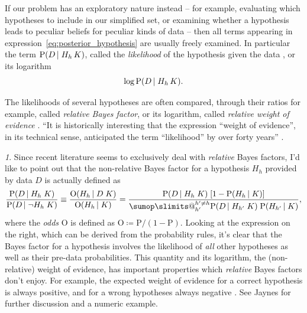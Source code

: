 \documentclass[\ifafour a4paper,12pt,\else a5paper,10pt,\fi%
onecolumn,oneside,article,%
british%
]{memoir}
\makeatletter
\theoremstyle{remark}
\theoremstyle{innote}
\newtheorem*{innote}{}
\def\sum{\DOTSI\sumop\slimits@}
\newcommand*{\citep}{\parencites}
\newcommand*{\citey}{\parencites*}
\newcommand*{\defd}{\coloneqq}
\newcommand*{\p}{\mathrm{P}}%
\renewcommand*{\|}[1][]{\nonscript\,#1\vert\nonscript\;\mathopen{}}
\newcommand*{\sect}{\S}%
\newcommand*{\sects}{\S\S}%
\newcommand*{\chap}{ch.}%
\newcommand*{\chaps}{chs}%
\newcommand*{\yK}{K}
\newcommand*{\yO}{\mathrm{O}}
\makeatother
\begin{document}
If our problem has an exploratory nature instead -- for example, evaluating
which hypotheses to include in our simplified set, or examining whether a
hypothesis leads to peculiar beliefs for peculiar kinds of data -- then all
terms appearing in expression~\eqref{eq:posterior_hypothesis} are usually
freely examined. In particular the term $\p(D \| H_{h} \, \yK)$, called the
\emph{likelihood} of the hypothesis given the data \citep[\sect~6.1
p.~62]{good1950}, or its logarithm
\begin{equation}
  \label{eq:log-likelihood}
  \log\p(D \| H_{h} \, \yK).
\end{equation}


The likelihoods of several hypotheses are often compared, through their
ratios for example, called \emph{relative Bayes factor}, or its logarithm,
called \emph{relative weight of evidence}
\citep[\chap~6]{good1950}{good1975,good1981,good1985}[and many other works
in][]{good1983}[\sect~1.4]{osteyeeetal1974}{mackay1992,kassetal1995}[see
also][\chaps~V, VI, A]{jeffreys1939_r1983}. \enquote{It is historically
  interesting that the expression ``weight of evidence'', in its technical
  sense, anticipated the term ``likelihood'' by over forty years}
\citep[\sect~1.4.2 p.~12]{osteyeeetal1974}.
\begin{innote}
  Since recent literature \citep[for example][]{kassetal1995} seems to
  exclusively deal with \emph{relative} Bayes factors, I'd like to point
  out that the non-relative Bayes factor for a hypothesis $H_{h}$
  provided by data $D$ is actually defined as \citep[\sect~2]{good1981}
  \begin{equation}
    \label{eq:proper_Bayes_factor}
    \frac{\p(D \| H_{h} \; \yK)}{\p(D \| \lnot H_{h} \; \yK)} \equiv
    \frac{\yO(H_{h} \| D \; \yK)}{\yO(H_{h} \| \yK)} =
    \frac{\p(D \| H_{h}\; \yK)\; [1- \p(H_{h} \| \yK)]}{
\sum_{h'}^{h' \ne h} \p(D \| H_{h'} \; \yK) \; \p(H_{h'} \| \yK)
    },
  \end{equation}
  where the \emph{odds} $\yO$ is defined as $\yO \defd \p/(1-\p)$. Looking
  at the expression on the right, which can be derived from the probability
  rules, it's clear that the Bayes factor for a hypothesis involves the
  likelihood of \emph{all} other hypotheses as well as their pre-data
  probabilities. This quantity and its logarithm, the (non-relative) weight
  of evidence, has important properties which \emph{relative} Bayes factors
  don't enjoy. For example, the expected weight of evidence for a correct
  hypothesis is always positive, and for a wrong hypotheses always negative
  \citep[\sect~6.7]{good1950}. See Jaynes
  \citey[\sects~4.3--4.4]{jaynes1994_r2003} for further discussion and a
  numeric example.
\end{innote}
\end{document}
